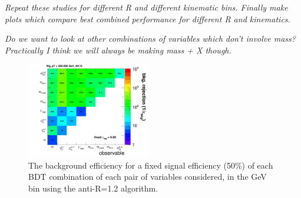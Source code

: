 {\it Repeat these studies for different R and different kinematic
bins. Finally make plots which compare best combined performance for
different R and kinematics.}

{\it Do we want to look at other combinations of variables which don't
involve mass? Practically I think we will always be making mass + X though.}


\begin{figure}
\begin{center}
\includegraphics[width=0.48\textwidth]{./Figures/figs072514/figs071614_Wg_bin500_ak12/rocs/effBkg2D.png}
\caption{The background efficiency
for a fixed signal efficiency (50\%) of each BDT combination of
each pair of variables considered, in the  GeV bin using the anti-\kT R=1.2
algorithm.}
\label{fig:pt500_2Dcomb_AKt_R12}
\end{center}
\end{figure}

